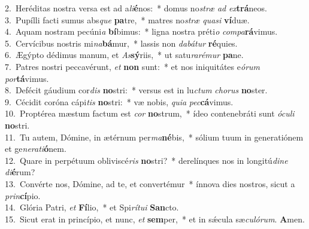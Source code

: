 {2.~}Heréditas nostra versa est ad a\textit{li}\textbf{é}nos:~* domus no\textit{stræ} \textit{ad} \textit{ex}\textbf{trá}neos.\\
{3.~}Pupílli facti sumus abs\textit{que} \textbf{pa}tre,~* matres no\textit{stræ} \textit{qua}\textit{si} \textbf{ví}duæ.\\
{4.~}Aquam nostram pecúni\textit{a} \textbf{bí}bimus:~* ligna nostra préti\textit{o} \textit{com}\textit{pa}\textbf{rá}vimus.\\
{5.~}Cervícibus nostris mi\textit{na}\textbf{bá}mur,~* lassis non \textit{da}\textit{bá}\textit{tur} \textbf{ré}quies.\\
{6.~}Ægýpto dédimus manum, et \textit{As}\textbf{sý}riis,~* ut satu\textit{ra}\textit{ré}\textit{mur} \textbf{pa}ne.\\
{7.~}Patres nostri peccavérunt, \textit{et} \textbf{non} sunt:~* et nos iniquitátes e\textit{ó}\textit{rum} \textit{por}\textbf{tá}vimus.\\
{8.~}Defécit gáudium cor\textit{dis} \textbf{no}stri:~* versus est in lu\textit{ctum} \textit{cho}\textit{rus} \textbf{no}ster.\\
{9.~}Cécidit coróna cápi\textit{tis} \textbf{no}stri:~* væ nobis, \textit{qui}\textit{a} \textit{pec}\textbf{cá}vimus.\\
{10.~}Proptérea mæstum factum est \textit{cor} \textbf{no}strum,~* ídeo contenebráti sunt \textit{ó}\textit{cu}\textit{li} \textbf{no}stri.\\
{11.~}Tu autem, Dómine, in ætérnum per\textit{ma}\textbf{né}bis,~* sólium tuum in generatiónem et ge\textit{ne}\textit{ra}\textit{ti}\textbf{ó}nem.\\
{12.~}Quare in perpétuum obliviscé\textit{ris} \textbf{no}stri?~* derelínques nos in longitú\textit{di}\textit{ne} \textit{di}\textbf{é}rum?\\
{13.~}Convérte nos, Dómine, ad te, et convertémur~* ínnova dies nostros, sicut a \textit{prin}\textbf{cí}pio.\\
{14.~}Glória Patri, \textit{et} \textbf{Fí}lio,~* et Spi\textit{rí}\textit{tu}\textit{i} \textbf{San}cto.\\
{15.~}Sicut erat in princípio, et nunc, \textit{et} \textbf{sem}per,~* et in sǽcula sæ\textit{cu}\textit{ló}\textit{rum}. \textbf{A}men.\\
